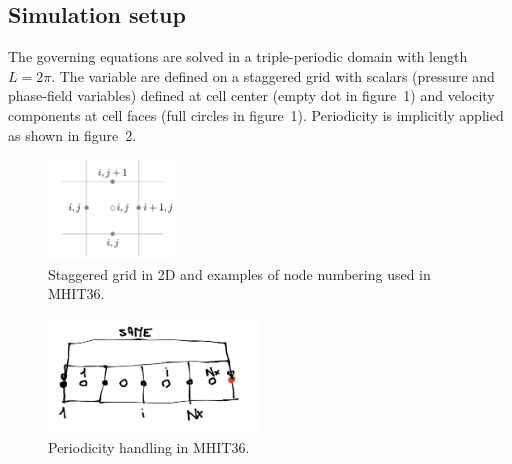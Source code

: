 \documentclass[11pt]{article}
\begin{document}
\subsection{Simulation setup}
The governing equations are solved in a triple-periodic domain with length $L=2 \pi$.
The variable are defined on a staggered grid with scalars (pressure and phase-field variables) defined at cell center (empty dot in figure~1) and velocity components at cell faces (full circles in figure~1).
Periodicity is implicitly applied as shown in figure~2.






\begin{figure}[!t]
\centering
    \includegraphics[width=0.3\textwidth]{staggered_2.png} 
    \caption{Staggered grid in 2D and examples of node numbering used in MHIT36.}
    \label{fig1}
\end{figure}

\begin{figure}[!t]
\centering
    \includegraphics[width=0.5\textwidth]{draw.png} 
    \caption{Periodicity handling in MHIT36.}
    \label{fig2}
\end{figure}
\end{document}
